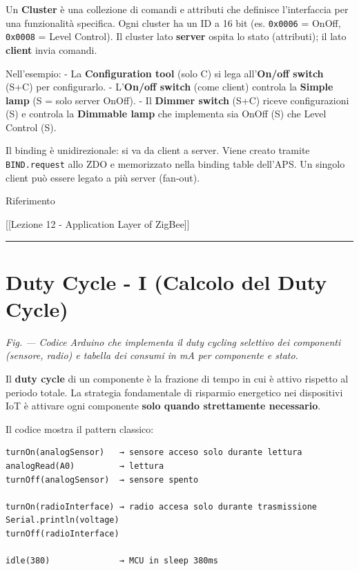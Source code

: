 \documentclass[
  italian,
  openany]{book}
\begin{document}
Un \textbf{Cluster} è una collezione di comandi e attributi che
definisce l'interfaccia per una funzionalità specifica. Ogni cluster ha
un ID a 16 bit (es. \texttt{0x0006} = OnOff, \texttt{0x0008} = Level
Control). Il cluster lato \textbf{server} ospita lo stato (attributi);
il lato \textbf{client} invia comandi.

Nell'esempio: - La \textbf{Configuration tool} (solo C) si lega
all'\textbf{On/off switch} (S+C) per configurarlo. - L'\textbf{On/off
switch} (come client) controla la \textbf{Simple lamp} (S = solo server
OnOff). - Il \textbf{Dimmer switch} (S+C) riceve configurazioni (S) e
controla la \textbf{Dimmable lamp} che implementa sia OnOff (S) che
Level Control (S).

Il binding è unidirezionale: si va da client a server. Viene creato
tramite \texttt{BIND.request} allo ZDO e memorizzato nella binding table
dell'APS. Un singolo client può essere legato a più server (fan-out).

\begin{calloutnote}{Riferimento}

{[}{[}Lezione 12 - Application Layer of ZigBee{]}{]}

\end{calloutnote}

\begin{center}\rule{0.5\linewidth}{0.5pt}\end{center}

\section{Duty Cycle - I (Calcolo del Duty
Cycle)}\label{duty-cycle---i-calcolo-del-duty-cycle}

\emph{Fig. --- Codice Arduino che implementa il duty cycling selettivo
dei componenti (sensore, radio) e tabella dei consumi in mA per
componente e stato.}

Il \textbf{duty cycle} di un componente è la frazione di tempo in cui è
attivo rispetto al periodo totale. La strategia fondamentale di
risparmio energetico nei dispositivi IoT è attivare ogni componente
\textbf{solo quando strettamente necessario}.

Il codice mostra il pattern classico:

\begin{verbatim}
turnOn(analogSensor)   → sensore acceso solo durante lettura
analogRead(A0)         → lettura
turnOff(analogSensor)  → sensore spento

turnOn(radioInterface) → radio accesa solo durante trasmissione
Serial.println(voltage)
turnOff(radioInterface)

idle(380)              → MCU in sleep 380ms
\end{verbatim}
\end{document}
